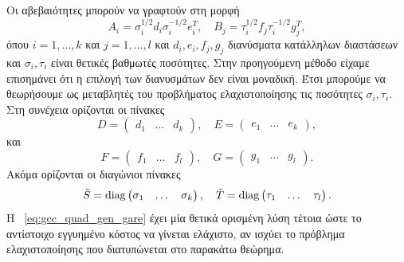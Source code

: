 Οι αβεβαιότητες μπορούν να γραφτούν στη μορφή
\[
    A_i = \sigma_i^{1/2}d_i\sigma_i^{-1/2}e_i^T, \quad
    B_j = \tau_i^{1/2}f_j\tau_i^{-1/2}g_j^T,
\]
όπου \( i = 1, \dots, k \) και \( j = 1, \dots, l \) και \(d_i, e_i, f_j, g_j \)
διανύσματα κατάλληλων διαστάσεων και \( \sigma_i, \tau_i \) είναι θετικές
βαθμωτές ποσότητες. Στην προηγούμενη μέθοδο είχαμε επισημάνει ότι η επιλογή των
διανυσμάτων δεν είναι μοναδική. Έτσι μπορούμε να θεωρήσουμε ως μεταβλητές του
προβλήματος ελαχιστοποίησης τις ποσότητες \( \sigma_i, \tau_i \). Στη συνέχεια
ορίζονται οι πίνακες
\[
    D = \begin{pmatrix} d_1 & \dots & d_k\end{pmatrix}, \quad
    E = \begin{pmatrix} e_1 & \dots & e_k\end{pmatrix},
\]
και
\[
    F = \begin{pmatrix} f_1 & \dots & f_l\end{pmatrix}, \quad
    G = \begin{pmatrix} g_1 & \dots & g_l\end{pmatrix}.
\]
Ακόμα ορίζονται οι διαγώνιοι πίνακες
\[
    \tilde{S} = \operatorname{diag}\begin{pmatrix} \sigma_1 & \dots & \sigma_k\end{pmatrix}, \quad
    \tilde{T} = \operatorname{diag}\begin{pmatrix} \tau_1 & \dots & \tau_l\end{pmatrix}.
\]
Η ~\eqref{eq:gcc_quad_gen_gare} έχει μία θετικά ορισμένη λύση
τέτοια ώστε το αντίστοιχο εγγυημένο κόστος να γίνεται ελάχιστο, αν
ισχύει το πρόβλημα ελαχιστοποίησης που διατυπώνεται στο παρακάτω θεώρημα.

